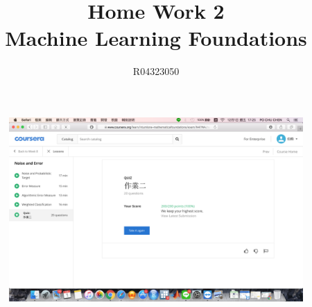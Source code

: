 \documentclass[a4paper,12pt]{article}
\title{Home Work 2\\ Machine Learning Foundations}
\author{R04323050 \\{\McQ\cH37}\z{\MbQ\cH200}\z{\MmQ\cH238}\z{\McQ\cH250}   \quad {\McQ\cH207}\z{\MdQ\cH43}\z{\MjQ\cH254}}
\date{}
\begin{document}
\maketitle
\section{}
\begin{figure}[h]
\centering
\includegraphics[scale=0.3]{Q1.png}
\end{figure}
\end{document}
